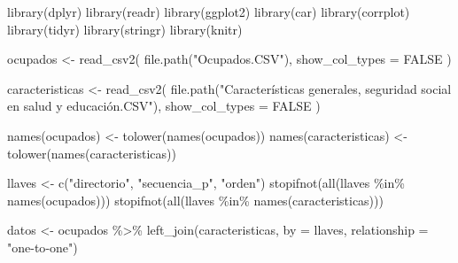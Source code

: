 \documentclass[
  spanish,
  letterpaper,
  DIV=11,
  numbers=noendperiod]{scrartcl}
\newenvironment{Shaded}{\begin{snugshade}}{\end{snugshade}}
\newcommand{\AttributeTok}[1]{\textcolor[rgb]{0.40,0.45,0.13}{#1}}
\newcommand{\ConstantTok}[1]{\textcolor[rgb]{0.56,0.35,0.01}{#1}}
\newcommand{\FunctionTok}[1]{\textcolor[rgb]{0.28,0.35,0.67}{#1}}
\newcommand{\NormalTok}[1]{\textcolor[rgb]{0.00,0.23,0.31}{#1}}
\newcommand{\OtherTok}[1]{\textcolor[rgb]{0.00,0.23,0.31}{#1}}
\newcommand{\SpecialCharTok}[1]{\textcolor[rgb]{0.37,0.37,0.37}{#1}}
\newcommand{\StringTok}[1]{\textcolor[rgb]{0.13,0.47,0.30}{#1}}
\begin{document}
\begin{Shaded}
\begin{Highlighting}[]
\FunctionTok{library}\NormalTok{(dplyr)}
\FunctionTok{library}\NormalTok{(readr)}
\FunctionTok{library}\NormalTok{(ggplot2)}
\FunctionTok{library}\NormalTok{(car)}
\FunctionTok{library}\NormalTok{(corrplot)}
\FunctionTok{library}\NormalTok{(tidyr)}
\FunctionTok{library}\NormalTok{(stringr)}
\FunctionTok{library}\NormalTok{(knitr)}
\end{Highlighting}
\end{Shaded}

\begin{Shaded}
\begin{Highlighting}[]
\NormalTok{ocupados }\OtherTok{\textless{}{-}} \FunctionTok{read\_csv2}\NormalTok{(}
  \FunctionTok{file.path}\NormalTok{(}\StringTok{"Ocupados.CSV"}\NormalTok{),}
  \AttributeTok{show\_col\_types =} \ConstantTok{FALSE}
\NormalTok{)}

\NormalTok{caracteristicas }\OtherTok{\textless{}{-}} \FunctionTok{read\_csv2}\NormalTok{(}
  \FunctionTok{file.path}\NormalTok{(}\StringTok{"Características generales, seguridad social en salud y educación.CSV"}\NormalTok{),}
  \AttributeTok{show\_col\_types =} \ConstantTok{FALSE}
\NormalTok{)}

\FunctionTok{names}\NormalTok{(ocupados) }\OtherTok{\textless{}{-}} \FunctionTok{tolower}\NormalTok{(}\FunctionTok{names}\NormalTok{(ocupados))}
\FunctionTok{names}\NormalTok{(caracteristicas) }\OtherTok{\textless{}{-}} \FunctionTok{tolower}\NormalTok{(}\FunctionTok{names}\NormalTok{(caracteristicas))}

\NormalTok{llaves }\OtherTok{\textless{}{-}} \FunctionTok{c}\NormalTok{(}\StringTok{"directorio"}\NormalTok{, }\StringTok{"secuencia\_p"}\NormalTok{, }\StringTok{"orden"}\NormalTok{)}
\FunctionTok{stopifnot}\NormalTok{(}\FunctionTok{all}\NormalTok{(llaves }\SpecialCharTok{\%in\%} \FunctionTok{names}\NormalTok{(ocupados)))}
\FunctionTok{stopifnot}\NormalTok{(}\FunctionTok{all}\NormalTok{(llaves }\SpecialCharTok{\%in\%} \FunctionTok{names}\NormalTok{(caracteristicas)))}

\NormalTok{datos }\OtherTok{\textless{}{-}}\NormalTok{ ocupados }\SpecialCharTok{\%\textgreater{}\%}
  \FunctionTok{left\_join}\NormalTok{(caracteristicas, }\AttributeTok{by =}\NormalTok{ llaves, }\AttributeTok{relationship =} \StringTok{"one{-}to{-}one"}\NormalTok{)}
\end{Highlighting}
\end{Shaded}
\end{document}
